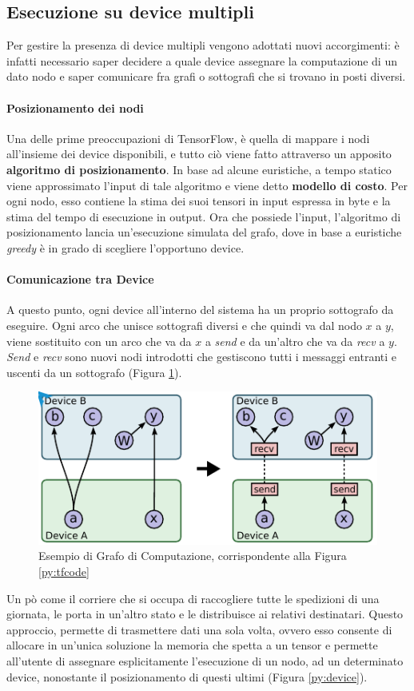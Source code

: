 \documentclass[DIV=calc, paper=a4, fontsize=11pt]{scrartcl}	 %
\begin{document}
\begin{multicols}{2}
			\subsection{Esecuzione su device multipli}
				Per gestire la presenza di device multipli vengono adottati nuovi accorgimenti: è infatti necessario saper decidere a quale device assegnare la computazione di un dato nodo e saper comunicare fra grafi o sottografi che si trovano in posti diversi.
				\paragraph*{Posizionamento dei nodi}\label{paragaph:partition} Una delle prime preoccupazioni di TensorFlow, è quella di mappare i nodi all'insieme dei device disponibili, e tutto ciò viene fatto attraverso un apposito \textbf{algoritmo di posizionamento}. In base ad alcune euristiche, a tempo statico viene approssimato l'input di tale algoritmo e viene detto \textbf{modello di costo}. Per ogni nodo, esso contiene la stima dei suoi tensori in input espressa in byte e la stima del tempo di esecuzione in output. Ora che possiede l'input, l'algoritmo di posizionamento lancia un'esecuzione simulata del grafo, dove in base a euristiche \textit{greedy} è in grado di scegliere l'opportuno device.
				\paragraph{Comunicazione tra Device}\label{paragraph:communication} A questo punto, ogni device all'interno del sistema ha un proprio sottografo da eseguire. Ogni arco che unisce sottografi diversi e che quindi va dal nodo $x$ a $y$, viene sostituito con un arco che va da $x$ a \textit{send} e da un'altro che va da \textit{recv} a $y$. \textit{Send} e \textit{recv} sono nuovi nodi introdotti che gestiscono tutti i messaggi entranti e uscenti da un sottografo (Figura \ref{fig:send-recv}).
				\begin{figure}[H]
					\centering
					\includegraphics[scale=.75]{img/send-recv.png}
					\caption{Esempio di Grafo di Computazione, corrispondente alla Figura \ref{py:tfcode}}
					\label{fig:send-recv}
				\end{figure}
				Un pò come il corriere che si occupa di raccogliere tutte le spedizioni di una giornata, le porta in un'altro stato e le distribuisce ai relativi destinatari. Questo approccio, permette di trasmettere dati una sola volta, ovvero esso consente di allocare in un'unica soluzione la memoria che spetta a un tensor e permette all'utente di assegnare esplicitamente l'esecuzione di un nodo, ad un determinato device, nonostante il posizionamento di questi ultimi (Figura \ref{py:device}).

\end{multicols}
\end{document}
